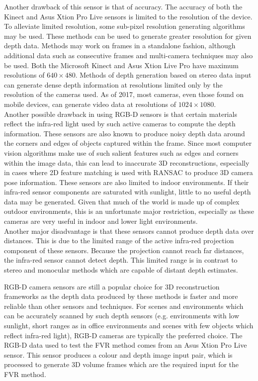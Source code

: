 Another drawback of this sensor is that of accuracy. The accuracy of both the Kinect and Asus Xtion Pro Live sensors is limited to the resolution of the device. To alleviate limited resolution, some sub-pixel resolution generating algorithms may be used. These methods can be used to generate greater resolution for given depth data. Methods may work on frames in a standalone fashion, although additional data such as consecutive frames and multi-camera techniques may also be used. Both the Microsoft Kinect and Asus Xtion Live Pro have maximum resolutions of $640 \times 480$. Methods of depth generation based on stereo data input can generate dense depth information at resolutions limited only by the resolution of the cameras used. As of 2017, most cameras, even those found on mobile devices, can generate video data at resolutions of $1024 \times 1080$. \\

Another possible drawback in using RGB-D sensors is that certain materials reflect the infra-red light used by such active cameras to compute the depth information. These sensors are also known to produce noisy depth data around the corners and edges of objects captured within the frame. Since most computer vision algorithms make use of such salient features such as edges and corners within the image data, this can lead to inaccurate 3D reconstructions, especially in cases where 2D feature matching is used with RANSAC to produce 3D camera pose information. These sensors are also limited to indoor environments. If their infra-red sensor components are saturated with sunlight, little to no useful depth data may be generated. Given that much of the world is made up of complex outdoor environments, this is an unfortunate major restriction, especially as these cameras are very useful in indoor and lower light environments. \\

Another major disadvantage is that these sensors cannot produce depth data over distances. This is due to the limited range of the active infra-red projection component of these sensors. Because the projection cannot reach far distances, the infra-red sensor cannot detect depth. This limited range is in contrast to stereo and monocular methods which are capable of distant depth estimates.  

RGB-D camera sensors are still a popular choice for 3D reconstruction frameworks as the depth data produced by these methods is faster and more reliable than other sensors and techniques. For scenes and environments which can be accurately scanned by such depth sensors (e.g. environments with low sunlight, short ranges as in office environments and scenes with few objects which reflect infra-red light), RGB-D cameras are typically the preferred choice. The RGB-D data used to test the FVR method comes from an Asus Xtion Pro Live sensor. This sensor produces a colour and depth image input pair, which is processed to generate 3D volume frames which are the required input for the FVR method. \\

